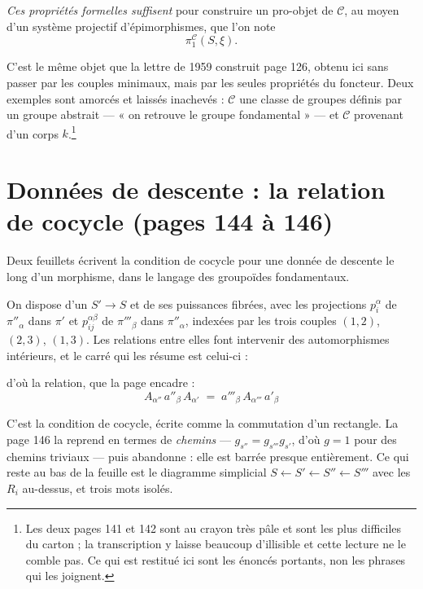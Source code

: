 \documentclass[11pt,a4paper]{article}
\begin{document}
\emph{Ces propriétés formelles suffisent} pour construire un pro-objet de
$\mathcal{C}$, au moyen d'un système projectif d'épimorphismes, que l'on note
\[
  \pi_{1}^{\mathcal{C}}(S, \xi) .
\]

C'est le même objet que la lettre de 1959 construit page 126, obtenu ici sans
passer par les couples minimaux, mais par les seules propriétés du foncteur.
Deux exemples sont amorcés et laissés inachevés : $\mathcal{C}$ une classe de
groupes définis par un groupe abstrait --- « on retrouve le groupe
fondamental » --- et $\mathcal{C}$ provenant d'un corps
$k$.\footnote{Les deux pages 141 et 142 sont au crayon très pâle et sont les
plus difficiles du carton ; la transcription y laisse beaucoup d'illisible et
cette lecture ne le comble pas. Ce qui est restitué ici sont les énoncés
portants, non les phrases qui les joignent.}

\section*{Données de descente : la relation de cocycle (pages 144 à 146)}

Deux feuillets écrivent la condition de cocycle pour une donnée de descente le
long d'un morphisme, dans le langage des groupoïdes fondamentaux.

On dispose d'un $S' \to S$ et de ses puissances fibrées, avec les projections
$p_{i}^{\alpha}$ de $\pi''_{\alpha}$ dans $\pi'$ et $p_{ij}^{\alpha\beta}$ de
$\pi'''_{\beta}$ dans $\pi''_{\alpha}$, indexées par les trois couples
$(1,2)$, $(2,3)$, $(1,3)$. Les relations entre elles font intervenir des
automorphismes intérieurs, et le carré qui les résume est celui-ci :


d'où la relation, que la page encadre :
\[
  \boxed{\; A_{\alpha''}\, a''_{\beta}\, A_{\alpha'} \;=\;
  a'''_{\beta}\, A_{\alpha'''}\, a'_{\beta} \;}
\]

C'est la condition de cocycle, écrite comme la commutation d'un rectangle. La
page 146 la reprend en termes de \emph{chemins} --- $g_{s''} = g_{s'''}g_{s'}$,
d'où $g = 1$ pour des chemins triviaux --- puis abandonne : elle est barrée
presque entièrement. Ce qui reste au bas de la feuille est le diagramme
simplicial $S \leftarrow S' \leftarrow S'' \leftarrow S'''$ avec les
$R_{i}$ au-dessus, et trois mots isolés.
\end{document}
